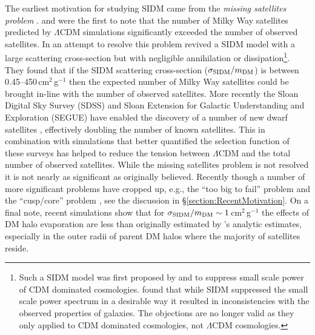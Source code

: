 The earliest motivation for studying SIDM came from the \textit{missing satellites problem} \citep[see][for a thorough review]{Bullock:2010uv}.
\citet{Moore:1999ja} and \citet{Klypin:1999ej} were the first to note that the number of Milky Way satellites predicted by $\Lambda$CDM simulations significantly exceeded the number of observed satellites.
In an attempt to resolve this problem \citet{Spergel:2000cb} revived a SIDM model with a large scattering cross-section but with negligible annihilation or dissipation\footnote{Such a SIDM model was first proposed by \citet{Carlson:1992cp} and \citet{Machacek:1994kj} to suppress small scale power of CDM dominated cosmologies.  \citet{deLaix:1995ey} found that while SIDM suppressed the small scale power spectrum in a desirable way it resulted in inconsistencies with the observed properties of galaxies.  The \citet{deLaix:1995ey} objections are no longer valid as they only applied to CDM dominated cosmologies, not $\Lambda$CDM cosmologies.}. 
They found that if the SIDM scattering cross-section ($\sigma_{\rm SIDM}/m_{\rm DM}$) is between 0.45--450\,cm$^2$\,g$^{-1}$ then the expected number of Milky Way satellites could be brought in-line with the number of observed satellites.
More recently the Sloan Digital Sky Survey (SDSS) and Sloan Extension for Galactic Understanding and Exploration (SEGUE) have enabled the discovery of a number of new dwarf satellites \citep[see][for a review]{Willman:2010fg}, effectively doubling the number of known satellites.
This in combination with simulations that better quantified the selection function of these surveys has helped to reduce the tension between $\Lambda$CDM and the total number of observed satellites.
While the missing satellites problem is not resolved it is not nearly as significant as originally believed.
Recently though a number of more significant problems have cropped up, e.g., the ``too big to fail'' problem\citep{BoylanKolchin:2012id} and the ``cusp/core'' problem \citep[e.g.,][]{deNaray:2008iz}, see the discussion in \S\ref{section:RecentMotivation}.
On a final note, recent simulations \citep{Rocha:2012tr} show that for $\sigma_{\rm SIDM}/m_{\rm DM} \sim 1$\,cm$^2$\,g$^{-1}$ the effects of DM halo evaporation are less than originally estimated by \citet{Spergel:2000cb}'s analytic estimates, especially in the outer radii of parent DM halos where the majority of satellites reside.

